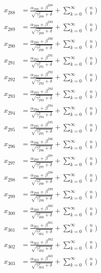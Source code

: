 \documentclass{article}
\begin{document}
\begin{align}
  x_{288} &= \frac{\alpha_{288} + \beta^{288}}{\sqrt{\gamma_{288}^2 + \delta}} + \sum_{k=0}^{\infty} \binom{n}{k} \label{eq:288} \\
  x_{289} &= \frac{\alpha_{289} + \beta^{289}}{\sqrt{\gamma_{289}^2 + \delta}} + \sum_{k=0}^{\infty} \binom{n}{k} \label{eq:289} \\
  x_{290} &= \frac{\alpha_{290} + \beta^{290}}{\sqrt{\gamma_{290}^2 + \delta}} + \sum_{k=0}^{\infty} \binom{n}{k} \label{eq:290} \\
  x_{291} &= \frac{\alpha_{291} + \beta^{291}}{\sqrt{\gamma_{291}^2 + \delta}} + \sum_{k=0}^{\infty} \binom{n}{k} \label{eq:291} \\
  x_{292} &= \frac{\alpha_{292} + \beta^{292}}{\sqrt{\gamma_{292}^2 + \delta}} + \sum_{k=0}^{\infty} \binom{n}{k} \label{eq:292} \\
  x_{293} &= \frac{\alpha_{293} + \beta^{293}}{\sqrt{\gamma_{293}^2 + \delta}} + \sum_{k=0}^{\infty} \binom{n}{k} \label{eq:293} \\
  x_{294} &= \frac{\alpha_{294} + \beta^{294}}{\sqrt{\gamma_{294}^2 + \delta}} + \sum_{k=0}^{\infty} \binom{n}{k} \label{eq:294} \\
  x_{295} &= \frac{\alpha_{295} + \beta^{295}}{\sqrt{\gamma_{295}^2 + \delta}} + \sum_{k=0}^{\infty} \binom{n}{k} \label{eq:295} \\
  x_{296} &= \frac{\alpha_{296} + \beta^{296}}{\sqrt{\gamma_{296}^2 + \delta}} + \sum_{k=0}^{\infty} \binom{n}{k} \label{eq:296} \\
  x_{297} &= \frac{\alpha_{297} + \beta^{297}}{\sqrt{\gamma_{297}^2 + \delta}} + \sum_{k=0}^{\infty} \binom{n}{k} \label{eq:297} \\
  x_{298} &= \frac{\alpha_{298} + \beta^{298}}{\sqrt{\gamma_{298}^2 + \delta}} + \sum_{k=0}^{\infty} \binom{n}{k} \label{eq:298} \\
  x_{299} &= \frac{\alpha_{299} + \beta^{299}}{\sqrt{\gamma_{299}^2 + \delta}} + \sum_{k=0}^{\infty} \binom{n}{k} \label{eq:299} \\
  x_{300} &= \frac{\alpha_{300} + \beta^{300}}{\sqrt{\gamma_{300}^2 + \delta}} + \sum_{k=0}^{\infty} \binom{n}{k} \label{eq:300} \\
  x_{301} &= \frac{\alpha_{301} + \beta^{301}}{\sqrt{\gamma_{301}^2 + \delta}} + \sum_{k=0}^{\infty} \binom{n}{k} \label{eq:301} \\
  x_{302} &= \frac{\alpha_{302} + \beta^{302}}{\sqrt{\gamma_{302}^2 + \delta}} + \sum_{k=0}^{\infty} \binom{n}{k} \label{eq:302} \\
  x_{303} &= \frac{\alpha_{303} + \beta^{303}}{\sqrt{\gamma_{303}^2 + \delta}} + \sum_{k=0}^{\infty} \binom{n}{k} \label{eq:303} \\

\end{align}
\end{document}

